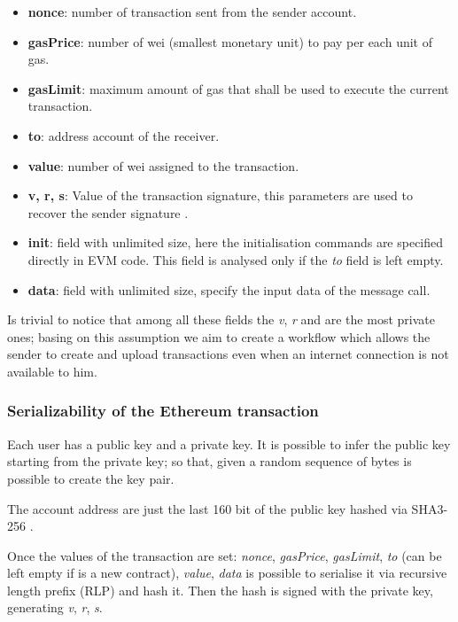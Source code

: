 \begin{itemize}
  \item \textbf{nonce}: number of transaction sent from the sender account.
  \item \textbf{gasPrice}: number of wei (smallest monetary unit) to pay per each unit of gas.
  \item \textbf{gasLimit}: maximum amount of gas that shall be used to execute the current transaction.
  \item \textbf{to}: address account of the receiver.
  \item \textbf{value}: number of wei assigned to the transaction.
  \item \textbf{v, r, s}: Value of the transaction signature, this parameters are used to recover the sender signature \cite{gura2004comparing}.
  \item \textbf{init}: field with unlimited size, here the initialisation commands are specified directly in EVM code. This field is analysed only if the \textit{to} field is left empty.
  \item \textbf{data}: field with unlimited size, specify the input data of the message call.
\end{itemize}

Is trivial to notice that among all these fields the \textit{v}, \textit{r} and  are the most private ones; basing on this assumption we aim to create a workflow which allows the sender to create and upload transactions even when an internet connection is not available to him. 

\subsubsection{Serializability of the Ethereum transaction}
Each user has a public key and a private key. It is possible to infer the public key starting from the private key; so that, given a random sequence of bytes is possible to create the key pair.

The account address are just the last 160 bit of the public key hashed via SHA3-256 \cite{sha3_256_keccak}.

Once the values of the transaction are set: \textit{nonce}, \textit{gasPrice}, \textit{gasLimit}, \textit{to} (can be left empty if is a new contract), \textit{value}, \textit{data} is possible to serialise it via recursive length prefix (RLP) \cite{ethereum_whitepaper} and hash it. Then the hash is signed with the private key, generating \textit{v}, \textit{r}, \textit{s}.

